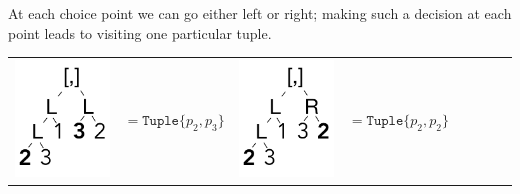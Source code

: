 \documentclass[a4paper,english]{lipics-v2019}
\newcommand{\xt}[1]{\texttt{#1}}
\newcommand{\tuple}[1]{\xt{Tuple\{}#1\xt{\}}}
\begin{document}
\noindent
At each choice point we can go either left or right; making such a decision
at each point leads to visiting one particular tuple.

\medskip
{\small
\begin{tabular}{@{}l@{~}ll@{~}ll@{~}ll@{~}l}
\begin{minipage}{1.2cm}\includegraphics[scale=.25]{figures/tree2.pdf} 
\end{minipage} &  $ =   \tuple{p_2,p_3} $ &
\begin{minipage}{1.2cm}\includegraphics[scale=.25]{figures/tree3.pdf} 
\end{minipage} &  $ =   \tuple{p_2,p_2} $ 

\end{tabular}}
\end{document}
